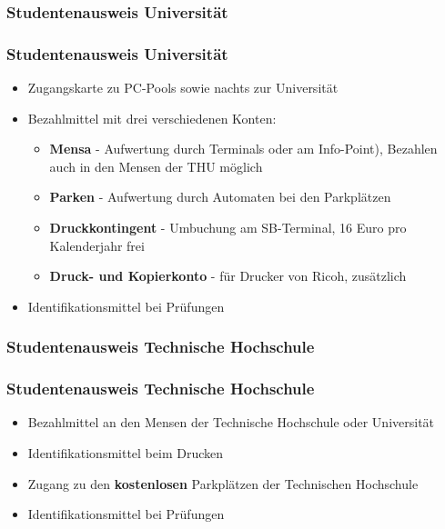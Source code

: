 \documentclass[10pt,a4paper]{beamer}
\begin{document}
    \subsubsection*{Studentenausweis Universität}
    \begin{frame}
        \frametitle{Studentenausweis Universität}
        \vfill
        \begin{itemize}
            \item Zugangskarte zu PC-Pools sowie nachts zur Universität
            \vfill
            \item Bezahlmittel mit drei verschiedenen Konten:
            \vfill
            \begin{itemize}
                \item \textbf{Mensa} - Aufwertung durch Terminals oder am Info-Point), Bezahlen auch in den Mensen der THU möglich
                \vfill
                \item \textbf{Parken} - Aufwertung durch Automaten bei den Parkplätzen
                \vfill
                \item \textbf{Druckkontingent} - Umbuchung am SB-Terminal, 16 Euro pro Kalenderjahr frei
                \vfill
                \item \textbf{Druck- und Kopierkonto} - für Drucker von Ricoh, zusätzlich
            \end{itemize}
            \vfill
            \item Identifikationsmittel bei Prüfungen
        \end{itemize}
        \vfill
    \end{frame}

    \subsubsection*{Studentenausweis Technische Hochschule}
    \begin{frame}
        \frametitle{Studentenausweis Technische Hochschule}
        \vfill
        \begin{itemize}
            \item Bezahlmittel an den Mensen der Technische Hochschule oder Universität
            \vfill
            \item Identifikationsmittel beim Drucken %
            \vfill
            \item Zugang zu den \textbf{kostenlosen} Parkplätzen der Technischen Hochschule
            \vfill
            \item Identifikationsmittel bei Prüfungen
        \end{itemize}
        \vfill
    \end{frame}
\end{document}
